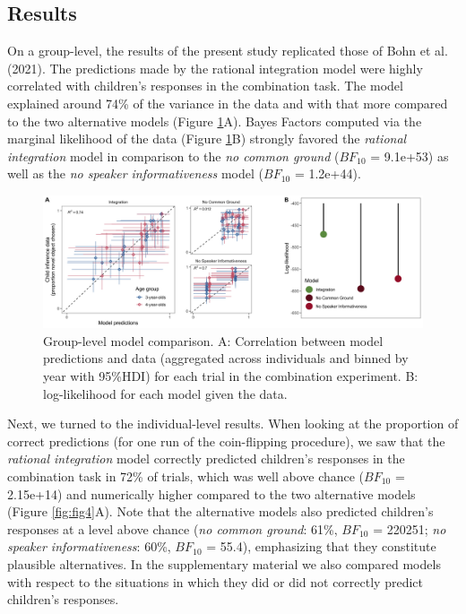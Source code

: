 \documentclass[
  man,floatsintext]{apa6}
\begin{document}
\hypertarget{results-1}{%
\subsection{Results}\label{results-1}}

On a group-level, the results of the present study replicated those of Bohn et al. (2021). The predictions made by the rational integration model were highly correlated with children's responses in the combination task. The model explained around 74\% of the variance in the data and with that more compared to the two alternative models (Figure \ref{fig:fig3}A). Bayes Factors computed via the marginal likelihood of the data (Figure \ref{fig:fig3}B) strongly favored the \emph{rational integration} model in comparison to the \emph{no common ground} (\(BF_{10}\) = 9.1e+53) as well as the \emph{no speaker informativeness} model (\(BF_{10}\) = 1.2e+44).

\begin{figure}
\includegraphics[width=1\linewidth]{./figures/fig3} \caption{Group-level model comparison. A: Correlation between model predictions and data (aggregated across individuals and binned by year with 95\%HDI) for each trial in the combination experiment. B: log-likelihood for each model given the data.}\label{fig:fig3}
\end{figure}

Next, we turned to the individual-level results. When looking at the proportion of correct predictions (for one run of the coin-flipping procedure), we saw that the \emph{rational integration} model correctly predicted children's responses in the combination task in 72\% of trials, which was well above chance (\(BF_{10}\) = 2.15e+14) and numerically higher compared to the two alternative models (Figure \ref{fig:fig4}A). Note that the alternative models also predicted children's responses at a level above chance (\emph{no common ground}: 61\%, \(BF_{10}\) = 220251; \emph{no speaker informativeness}: 60\%, \(BF_{10}\) = 55.4), emphasizing that they constitute plausible alternatives. In the supplementary material we also compared models with respect to the situations in which they did or did not correctly predict children's responses.
\end{document}
